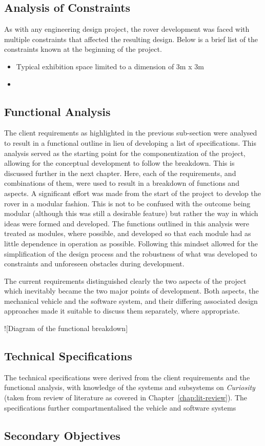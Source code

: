   \subsection{Analysis of Constraints}
    As with any engineering design project, the rover development was faced with multiple constraints that affected the resulting design. Below is a brief list of the constraints known at the beginning of the project.
    
    \begin{itemize}
      \item Typical exhibition space limited to a dimension of 3m x 3m
      \item 
    \end{itemize}
    
  \subsection{Functional Analysis}
    The client requirements as highlighted in the previous sub-section were analysed to result in a functional outline in lieu of developing a list of specifications. This analysis served as the starting point for the componentization of the project, allowing for the conceptual development to follow the breakdown. This is discussed further in the next chapter. Here, each of the requirements, and combinations of them, were used to result in a breakdown of functions and aspects. A significant effort was made from the start of the project to develop the rover in a modular fashion. This is not to be confused with the outcome being modular (although this was still a desirable feature) but rather the way in which ideas were formed and developed. The functions outlined in this analysis were treated as modules, where possible, and developed so that each module had as little dependence in operation as possible. Following this mindset allowed for the simplification of the design process and the robustness of what was developed to constraints and unforeseen obstacles during development.
    
    The current requirements distinguished clearly the two aspects of the project which inevitably became the two major points of development. Both aspects, the mechanical vehicle and the software system, and their differing associated design approaches made it suitable to discuss them separately, where appropriate.
    
    ![Diagram of the functional breakdown]
    
    
  \subsection{Technical Specifications}
    The technical specifications were derived from the client requirements and the functional analysis, with knowledge of the systems and subsystems on \textit{Curiosity} (taken from review of literature as covered in Chapter~\ref{chap:lit-review}). The specifications further compartmentalised the vehicle and software systems
  
  \subsection{Secondary Objectives}  